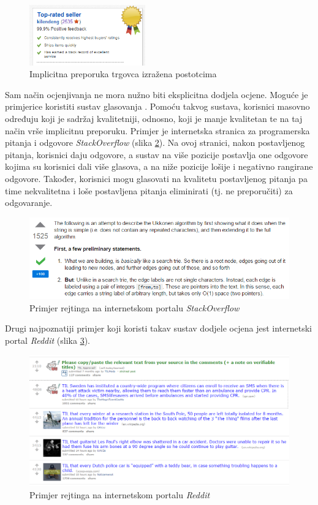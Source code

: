 \documentclass[times, utf8, diplomski, numeric]{fer}
\begin{document}
\begin{figure}[!htb]
	\centering
	\includegraphics[width=5cm]{images/neosobni/ebay2.png}
	\caption{Implicitna preporuka trgovca izražena postotcima}
	\label{fig:Ebay2}
\end{figure}

Sam način ocjenjivanja ne mora nužno biti eksplicitna dodjela ocjene. Moguće je
primjerice koristiti sustav glasovanja  . Pomoću takvog sustava, korisnici masovno određuju koji je sadržaj
kvalitetniji, odnosno, koji je manje kvalitetan te na taj način vrše implicitnu
preporuku. Primjer je internetska stranica za programerska pitanja i odgovore
\emph{StackOverflow} (slika \ref{fig:stackoverflow1}). Na ovoj stranici, nakon
postavljenog pitanja, korisnici daju odgovore, a sustav na više pozicije
postavlja one odgovore kojima su korisnici dali više glasova, a na niže pozicije
lošije i negativno rangirane odgovore. Također, korisnici mogu glasovati na
kvalitetu postavljenog pitanja pa time nekvalitetna i loše postavljena pitanja
eliminirati (tj. ne preporučiti) za odgovaranje. 

\begin{figure}[!htb]
	\centering
	\includegraphics[width=14.21cm]{images/neosobni/stackoverflow1.png}
	\caption{Primjer rejtinga na internetskom portalu \emph{StackOverflow}}
	\label{fig:stackoverflow1}
\end{figure}

Drugi najpoznatiji primjer koji koristi takav sustav dodjele ocjena jest
internetski portal \emph{Reddit} (slika \ref{fig:reddit1}).
\begin{figure}[!htb]
	\centering
	\includegraphics[width=14.21cm]{images/neosobni/reddit1.png}
	\caption{Primjer rejtinga na internetskom portalu \emph{Reddit}}
	\label{fig:reddit1}
\end{figure}
\end{document}

